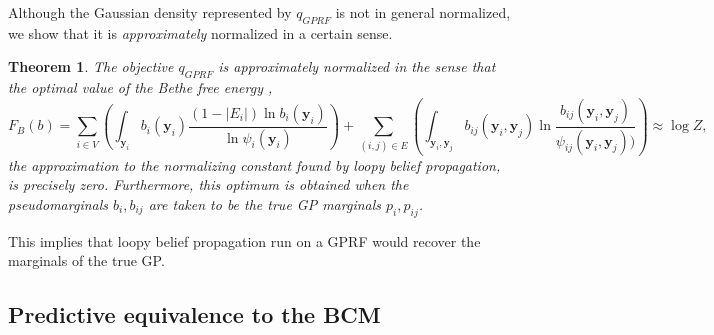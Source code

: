 \documentclass{article}
\newtheorem{theorem}{Theorem}
\renewcommand{\v}[1]{\mathbf{#1}}
\begin{document}
Although the Gaussian density represented by $q_{GPRF}$ is not in general normalized, we show that it is {\em
  approximately} normalized in a certain sense. 

\begin{theorem}
The objective $q_{GPRF}$ is approximately normalized in the sense that
the optimal value of the {\em Bethe free energy} \cite{yedidia2001bethe}, 
\begin{equation}
F_B(b) = \sum_{i\in V} \left(\int_{\v{y}_i} b_i(\v{y}_i) \frac{(1-|E_i|)\ln
    b_i(\v{y}_i)}{\ln \psi_i(\v{y}_i)}\right)  + \sum_{(i,j)\in E} \left(\int_{\v{y}_i, \v{y}_j} b_{ij}(\v{y}_i,
  \v{y}_j) \ln \frac{b_{ij}(\v{y}_i,
  \v{y}_j)}{\psi_{ij}(\v{y}_i, \v{y}_j))}\right)
\label{eqn:bethe-energy} \approx \log Z,
\end{equation}
the approximation to the normalizing constant found by loopy belief
propagation, is precisely zero. Furthermore, this
optimum is obtained when the pseudomarginals $b_i, b_{ij}$ are
taken to be the true GP marginals $p_i, p_{ij}$. 
\end{theorem}

This implies that loopy belief propagation run on a GPRF
would recover the marginals of the true GP.

\subsection{Predictive equivalence to the BCM}
\label{sec:approx-predict}
\end{document}
